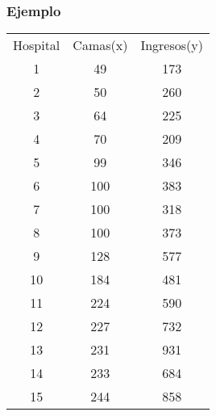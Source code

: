 ﻿\documentclass{beamer}
\begin{document}
\begin{frame}[allowframebreaks*]
\frametitle{Ejemplo}
\begin{tabular}{|c|c|c|}
                                                                                  \hline
                                                                                  Hospital & Camas(x) & Ingresos(y) \\
                                                                                  1 & 49 & 173 \\
                                                                                  2 & 50 & 260 \\
                                                                                  3 & 64 & 225 \\
                                                                                  4 & 70 & 209 \\
                                                                                  5 & 99 & 346 \\
                                                                                  6 & 100 & 383 \\
                                                                                  7 & 100 & 318 \\                                                                  8 & 100 & 373 \\
                                                                                  9 & 128 & 577 \\
                                                                                  10 & 184 & 481 \\
                                                                                  11 & 224 & 590 \\
                                                                                  12 & 227 & 732 \\
                                                                                  13 & 231 & 931 \\
                                                                                  14 & 233 & 684 \\
                                                                                  15 & 244 & 858 \\

\end{tabular}
\end{frame}
\end{document}
